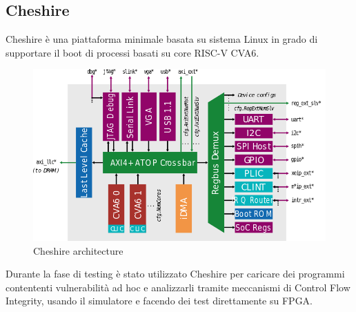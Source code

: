 \subsection*{Cheshire}
Cheshire \cite{ottaviano2023cheshire} è una piattaforma minimale basata su sistema Linux in grado di supportare il boot di processi basati su core RISC-V CVA6.
\vspace{1cm}
\FloatBarrier
\begin{figure}[!htbp]
    \centering
    \includegraphics[width=1\linewidth]{images/arch.png}
    \caption{Cheshire architecture} 
\end{figure}
\FloatBarrier
\vspace{1cm}
Durante la fase di testing è stato utilizzato Cheshire per caricare dei programmi contententi vulnerabilità ad hoc e analizzarli tramite meccanismi di Control Flow Integrity, usando il simulatore e facendo dei test direttamente su FPGA.